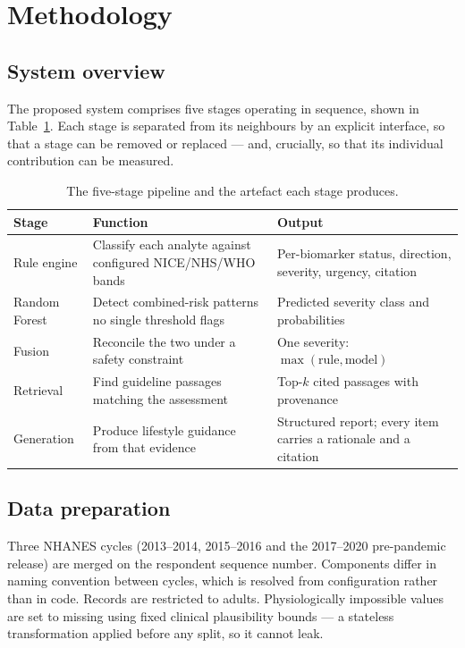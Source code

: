 \documentclass[11pt,a4paper]{article}
\begin{document}
\section{Methodology}

\subsection{System overview}

The proposed system comprises five stages operating in sequence, shown in
Table~\ref{tab:pipeline}. Each stage is separated from its neighbours by an
explicit interface, so that a stage can be removed or replaced --- and, crucially,
so that its individual contribution can be measured.

\begin{table}[h!]
\centering
\caption{The five-stage pipeline and the artefact each stage produces.\label{tab:pipeline}}
\renewcommand{\arraystretch}{1.15}
\begin{tabular}{|p{2.6cm}|p{5.4cm}|p{7.4cm}|}
\hline
\textbf{Stage} & \textbf{Function} & \textbf{Output} \\
\hline
Rule engine & Classify each analyte against configured NICE/NHS/WHO bands & Per-biomarker status, direction, severity, urgency, citation \\
\hline
Random Forest & Detect combined-risk patterns no single threshold flags & Predicted severity class and probabilities \\
\hline
Fusion & Reconcile the two under a safety constraint & One severity: $\max(\text{rule}, \text{model})$ \\
\hline
Retrieval & Find guideline passages matching the assessment & Top-$k$ cited passages with provenance \\
\hline
Generation & Produce lifestyle guidance from that evidence & Structured report; every item carries a rationale and a citation \\
\hline
\end{tabular}
\end{table}

\subsection{Data preparation}

Three NHANES cycles (2013--2014, 2015--2016 and the 2017--2020 pre-pandemic
release) are merged on the respondent sequence number. Components differ in naming
convention between cycles, which is resolved from configuration rather than in
code. Records are restricted to adults. Physiologically impossible values are set
to missing using fixed clinical plausibility bounds --- a stateless transformation
applied before any split, so it cannot leak.
\end{document}
